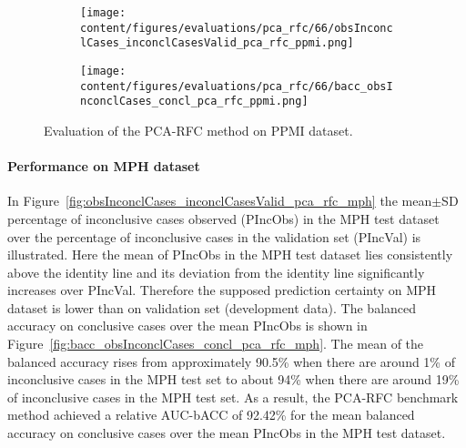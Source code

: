 \begin{figure}[ht]
  \begin{subfigure}{0.49\textwidth}
    \centering
    \texttt{[image: content/figures/evaluations/pca\_rfc/66/obsInconclCases\_inconclCasesValid\_pca\_rfc\_ppmi.png]}
    \label{fig:obsInconclCases_inconclCasesValid_pca_rfc_ppmi}
  \end{subfigure}
  \hfill
  \begin{subfigure}{0.49\textwidth}
    \centering
    \texttt{[image: content/figures/evaluations/pca\_rfc/66/bacc\_obsInconclCases\_concl\_pca\_rfc\_ppmi.png]}
    \label{fig:bacc_obsInconclCases_concl_pca_rfc_ppmi}
  \end{subfigure}
  \caption{Evaluation of the PCA-RFC method on PPMI dataset.}
  \label{fig:perf_results_rfc_ppmi}
\end{figure}




\paragraph{Performance on MPH dataset}

In Figure~\ref{fig:obsInconclCases_inconclCasesValid_pca_rfc_mph} 
the mean$\pm$SD percentage of inconclusive cases observed (PIncObs) in the MPH test dataset 
over the percentage of inconclusive cases in the validation set (PIncVal) is illustrated.
Here the mean of PIncObs in the MPH test dataset lies consistently above the identity line 
and its deviation from the identity line significantly increases over PIncVal.
Therefore the supposed prediction certainty on MPH dataset is lower than on validation set (development data).
The balanced accuracy on conclusive cases over the mean PIncObs is shown 
in Figure~\ref{fig:bacc_obsInconclCases_concl_pca_rfc_mph}.
The mean of the balanced accuracy rises from approximately 90.5\% 
when there are around 1\% of inconclusive cases in the MPH test set to about 94\% 
when there are around 19\% of inconclusive cases in the MPH test set.
As a result, the PCA-RFC benchmark method achieved a relative AUC-bACC of 92.42\% for the mean balanced accuracy on conclusive cases 
over the mean PIncObs in the MPH test dataset.


